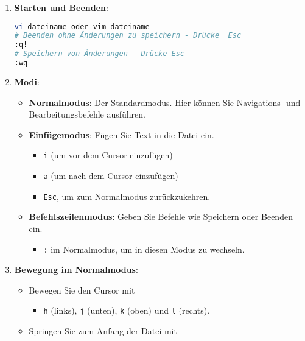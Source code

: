 \documentclass{vorlage-design-main}
\begin{document}
\begin{enumerate}
\def\labelenumi{\arabic{enumi}.}
\item
  \textbf{Starten und Beenden}:

\begin{lstlisting}[language=bash]
vi dateiname oder vim dateiname
# Beenden ohne Änderungen zu speichern - Drücke  Esc
:q!
# Speichern von Änderungen - Drücke Esc
:wq
\end{lstlisting}
\item
  \textbf{Modi}:

  \begin{itemize}
  
  \item
    \textbf{Normalmodus}: Der Standardmodus. Hier können Sie
    Navigations- und Bearbeitungsbefehle ausführen.
  \item
    \textbf{Einfügemodus}: Fügen Sie Text in die Datei ein.

    \begin{itemize}
    
    \item
      \verb|i| (um vor dem Cursor einzufügen)
    \item
      \verb|a| (um nach dem Cursor einzufügen)
    \item
      \verb|Esc|, um zum Normalmodus zurückzukehren.
    \end{itemize}
  \item
    \textbf{Befehlszeilenmodus}: Geben Sie Befehle wie Speichern oder
    Beenden ein.

    \begin{itemize}
    
    \item
      \verb|:| im Normalmodus, um in diesen Modus zu
      wechseln.
    \end{itemize}
  \end{itemize}
\item
  \textbf{Bewegung im Normalmodus}:

  \begin{itemize}
  
  \item
    Bewegen Sie den Cursor mit

    \begin{itemize}
    
    \item
      \verb|h| (links), \verb|j|
      (unten), \verb|k| (oben) und
      \verb|l| (rechts).
    \end{itemize}
  \item
    Springen Sie zum Anfang der Datei mit


\end{itemize}
\end{enumerate}
\end{document}
